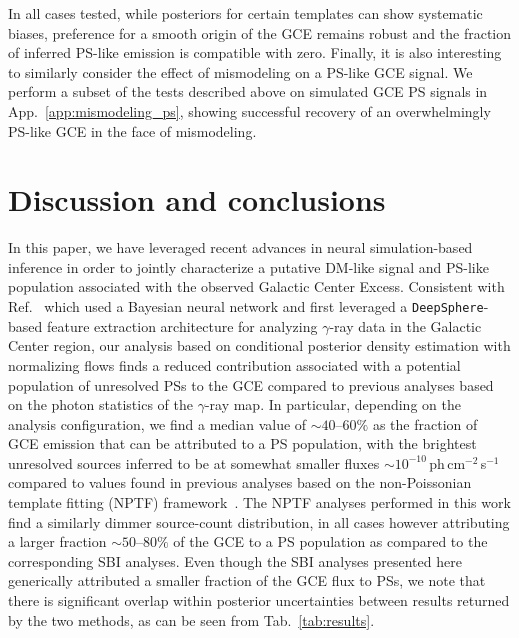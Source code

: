 \documentclass[prd,aps,10pt,nofootinbib,twocolumn,superscriptaddress,preprintnumbers,balancelastpage,longbibliography,floatfix]{revtex4-2}
\begin{document}
\bigskip

In all cases tested, while posteriors for certain templates can show systematic biases, preference for a smooth origin of the GCE remains robust and the fraction of inferred PS-like emission is compatible with zero. Finally, it is also interesting to similarly consider the effect of mismodeling on a PS-like GCE signal. We perform a subset of the tests described above on simulated GCE PS signals in App.~\ref{app:mismodeling_ps}, showing successful recovery of an overwhelmingly PS-like GCE in the face of mismodeling.

\section{Discussion and conclusions}
\label{sec:conclusion}

In this paper, we have leveraged recent advances in neural simulation-based inference in order to jointly characterize a putative DM-like signal and PS-like population associated with the observed \Fermi Galactic Center Excess. Consistent with Ref.~\cite{List:2020mzd} which used a Bayesian neural network and first leveraged a \texttt{DeepSphere}-based feature extraction architecture for analyzing $\gamma$-ray data in the Galactic Center region, our analysis based on conditional posterior density estimation with normalizing flows finds a reduced contribution associated with a potential population of unresolved PSs to the GCE compared to previous analyses based on the photon statistics of the $\gamma$-ray map. In particular, depending on the analysis configuration, we find a median value of $\sim40$--$60\%$ as the fraction of GCE emission that can be attributed to a PS population, with the brightest unresolved sources inferred to be at somewhat smaller fluxes $\sim 10^{-10}$\,ph\,cm$^{-2}$\,s$^{-1}$ compared to values found in previous analyses based on the non-Poissonian template fitting (NPTF) framework~\cite{Lee:2015fea}. The NPTF analyses performed in this work find a similarly dimmer source-count distribution, in all cases however attributing a larger fraction $\sim50$--$80\%$ of the GCE to a PS population as compared to the corresponding SBI analyses. Even though the SBI analyses presented here generically attributed a smaller fraction of the GCE flux to PSs, we note that there is significant overlap within posterior uncertainties between results returned by the two methods, as can be seen from Tab.~\ref{tab:results}.
\end{document}
